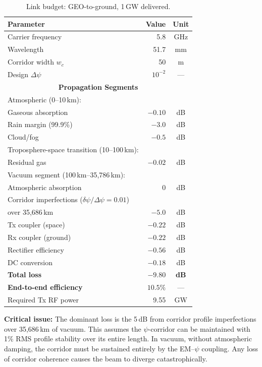 \documentclass[journal,twocolumn]{IEEEtran}
\begin{document}
\begin{table}[h]
\caption{Link budget: GEO-to-ground, 1\,GW delivered.}
\label{tab:link_C}
\centering
\begin{tabular}{lrc}
\toprule
Parameter & Value & Unit \\
\midrule
Carrier frequency & 5.8 & GHz \\
Wavelength & 51.7 & mm \\
Corridor width $w_c$ & 50 & m \\
Design $\Delta\psi$ & $10^{-2}$ & --- \\
\midrule
\multicolumn{3}{c}{\textbf{Propagation Segments}} \\
\midrule
Atmospheric (0--10\,km): & & \\
\quad Gaseous absorption & $-0.10$ & dB \\
\quad Rain margin (99.9\%) & $-3.0$ & dB \\
\quad Cloud/fog & $-0.5$ & dB \\
Troposphere-space transition (10--100\,km): & & \\
\quad Residual gas & $-0.02$ & dB \\
Vacuum segment (100\,km--35,786\,km): & & \\
\quad Atmospheric absorption & $0$ & dB \\
\quad Corridor imperfections ($\delta\psi/\Delta\psi = 0.01$) & & \\
\quad \quad over 35,686\,km & $-5.0$ & dB \\
\midrule
Tx coupler (space) & $-0.22$ & dB \\
Rx coupler (ground) & $-0.22$ & dB \\
Rectifier efficiency & $-0.56$ & dB \\
DC conversion & $-0.18$ & dB \\
\midrule
\textbf{Total loss} & $\mathbf{-9.80}$ & \textbf{dB} \\
\textbf{End-to-end efficiency} & $\mathbf{10.5\%}$ & --- \\
\midrule
Required Tx RF power & 9.55 & GW \\
\bottomrule
\end{tabular}
\end{table}

\textbf{Critical issue:} The dominant loss is the 5\,dB from corridor
profile imperfections over 35,686\,km of vacuum. This assumes the
$\psi$-corridor can be maintained with 1\% RMS profile stability over
its entire length. In vacuum, without atmospheric damping, the corridor
must be sustained entirely by the EM--$\psi$ coupling. Any loss of
corridor coherence causes the beam to diverge catastrophically.
\end{document}
